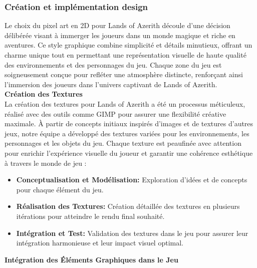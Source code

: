 \subsubsection{Création et implémentation design}

Le choix du pixel art en 2D pour Lands of Azerith découle d'une décision délibérée visant à immerger les joueurs dans un monde magique et riche en aventures. 
Ce style graphique combine simplicité et détails minutieux, offrant un charme unique tout en permettant une représentation visuelle de haute qualité des environnements et des personnages du jeu. 
Chaque zone du jeu est soigneusement conçue pour refléter une atmosphère distincte, renforçant ainsi l'immersion des joueurs dans l'univers captivant de Lands of Azerith.
\\

\textbf{Création des Textures}
\\

La création des textures pour Lands of Azerith a été un processus méticuleux, réalisé avec des outils comme GIMP pour assurer une flexibilité créative maximale. 
À partir de concepts initiaux inspirés d'images et de textures d'autres jeux, notre équipe a développé des textures variées pour les environnements, les personnages et les objets du jeu. 
Chaque texture est peaufinée avec attention pour enrichir l'expérience visuelle du joueur et garantir une cohérence esthétique à travers le monde de jeu :
\\

\begin{itemize}

    \item \textbf{Conceptualisation et Modélisation:} Exploration d'idées et de concepts pour chaque élément du jeu.
          \\

    \item \textbf{Réalisation des Textures:} Création détaillée des textures en plusieurs itérations pour atteindre le rendu final souhaité.
          \\

    \item \textbf{Intégration et Test:} Validation des textures dans le jeu pour assurer leur intégration harmonieuse et leur impact visuel optimal.
          \\

\end{itemize}

\textbf{Intégration des Éléments Graphiques dans le Jeu}
\\


